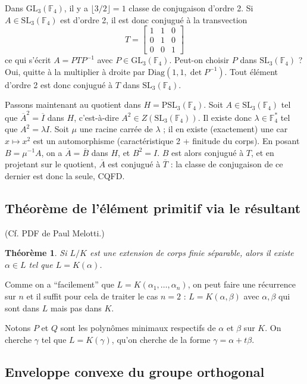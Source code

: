 \documentclass[a4paper, 11pt]{article}
\def\F{\mathbb{F}}
\def\GL{\mathrm{GL}}
\def\SL{\mathrm{SL}}
\def\PSL{\mathrm{PSL}}
\def\Diag{\mathrm{Diag}}
\newtheorem*{theorem}{Théorème}
\begin{document}
Dans $\GL_3(\F_4)$, il y a $\lfloor 3/2 \rfloor = 1$ classe de conjugaison
d'ordre 2. Si $A \in \SL_3(\F_4)$ est d'ordre 2, il est donc conjugué à la
transvection
\[ T = \left[\begin{matrix}
      1 & 1 & 0 \\
      0 & 1 & 0 \\
      0 & 0 & 1
    \end{matrix}\right] \]
ce qui s'écrit $A = PTP^{-1}$ avec $P \in \GL_3(\F_4)$. Peut-on choisir $P$ dans
$\SL_3(\F_4)$ ? Oui, quitte à la multiplier à droite par $\Diag(1,1,\det
P^{-1})$. Tout élément d'ordre 2 est donc conjugué à $T$ dans $\SL_3(\F_4)$.

Passons maintenant au quotient dans $H = \PSL_3(\F_4)$. Soit $A \in \SL_3(\F_4)$
tel que $\overline{A}^2 = \overline{I}$ dans $H$, c'est-à-dire $A^2 \in
Z(\SL_3(\F_4))$. Il existe donc $\lambda \in \F_4^*$ tel que $A^2 = \lambda I$.
Soit $\mu$ une racine carrée de $\lambda$ ; il en existe (exactement) une car $x
\mapsto x^2$ est un automorphisme (caractéristique 2 + finitude du corps). En
posant $B = \mu^{-1}A$, on a $\overline{A} = \overline{B}$ dans $H$, et $B^2 =
I$. $B$ est alors conjugué à $T$, et en projetant sur le quotient,
$\overline{A}$ est conjugué à $\overline{T}$ : la classe de conjugaison de ce
dernier est donc la seule, CQFD.

\newpage

\subsection{Théorème de l'élément primitif via le résultant}

(Cf. PDF de Paul Melotti.)

\begin{theorem}
  Si $L/K$ est une extension de corps finie séparable, alors il existe $\alpha
  \in L$ tel que $L = K(\alpha)$.
\end{theorem}

Comme on a \enquote{facilement} que $L = K(\alpha_1, \ldots, \alpha_n)$, on peut
faire une récurrence sur $n$ et il suffit pour cela de traiter le cas $n = 2$ :
$L = K(\alpha,\beta)$ avec $\alpha, \beta$ qui sont dans $L$ mais pas dans $K$.

Notons $P$ et $Q$ sont les polynômes minimaux respectifs de $\alpha$ et $\beta$
sur $K$. On cherche $\gamma$ tel que $L = K(\gamma)$, qu'on cherche de la forme
$\gamma = \alpha + t\beta$.

\newpage

\subsection{Enveloppe convexe du groupe orthogonal}
\end{document}
